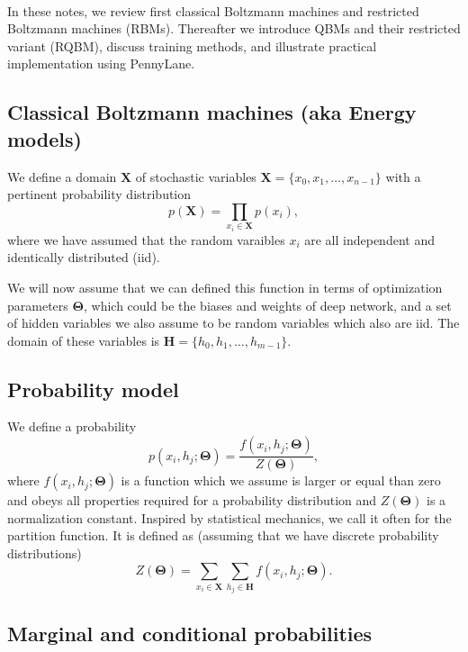 \documentclass[%
oneside,                 %
final,                   %
10pt]{article}
\begin{document}
\paragraph{}
In these notes, we review
first classical Boltzmann machines and restricted Boltzmann machines (RBMs).
Thereafter we
introduce QBMs and their restricted variant (RQBM), discuss training
methods, and illustrate practical implementation using
PennyLane.



\subsection*{Classical Boltzmann machines (aka Energy models)}

We define a domain $\bm{X}$ of stochastic variables $\bm{X}= \{x_0,x_1, \dots , x_{n-1}\}$ with a pertinent probability distribution
\[
p(\bm{X})=\prod_{x_i\in \bm{X}}p(x_i),
\]
where we have assumed that the random varaibles $x_i$ are all independent and identically distributed (iid).

We will now assume that we can defined this function in terms of optimization parameters $\bm{\Theta}$, which could be the biases and weights of deep network, and a set of hidden variables we also assume to be random variables which also are iid. The domain of these variables is
$\bm{H}= \{h_0,h_1, \dots , h_{m-1}\}$.

\subsection*{Probability model}

We define a probability
\[
p(x_i,h_j;\bm{\Theta}) = \frac{f(x_i,h_j;\bm{\Theta})}{Z(\bm{\Theta})},
\]
where $f(x_i,h_j;\bm{\Theta})$ is a function which we assume is larger or
equal than zero and obeys all properties required for a probability
distribution and $Z(\bm{\Theta})$ is a normalization constant. Inspired by
statistical mechanics, we call it often for the partition function.
It is defined as (assuming that we have discrete probability distributions)
\[
Z(\bm{\Theta})=\sum_{x_i\in \bm{X}}\sum_{h_j\in \bm{H}} f(x_i,h_j;\bm{\Theta}).
\]

\subsection*{Marginal and conditional probabilities}
\end{document}
